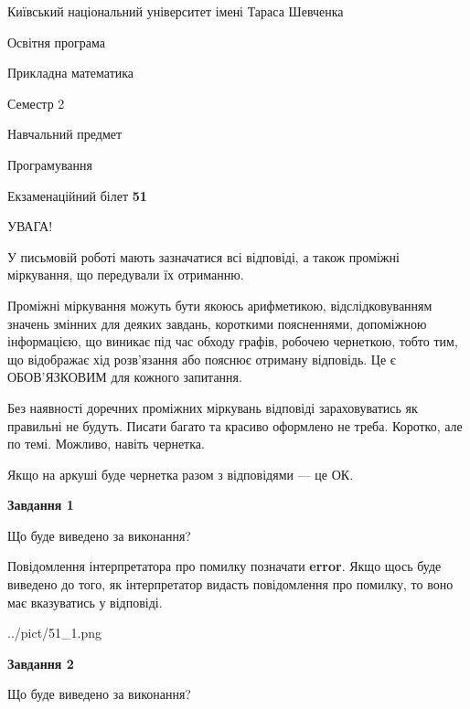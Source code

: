 \documentclass[12pt, ukrainian]{article}
\begin{document}
{{\begin {small}\par
{ \center  Київський національний університет імені Тараса Шевченка \par}
{\parbox {5 cm}{Освітня програма \hfill}{\parbox {7 cm}{Прикладна математика \hfill}}\parbox {6 cm}{\hfill Семестр 2}}\par
{\parbox {5 cm} {Навчальний предмет \hfill}\parbox {7 cm}{Програмування \hfill}\parbox {6cm}{\hfill}\par}\vspace{-7pt} \end{small}}{\center Екзаменаційний білет \No \textbf
{ 51 }\par}}
{
\begin {large}
УВАГА!

У письмовій роботі мають зазначатися всі відповіді, а також проміжні міркування, що передували їх отриманню.

Проміжні міркування можуть бути якоюсь арифметикою, відслідковуванням зна\-чень змінних для деяких завдань,
короткими поясненнями, допоміжною інформацією, що виникає під час обходу графів, робочею чернеткою,
тобто тим, що відображає хід розв’язання або пояснює отриману відповідь.
Це є ОБОВ’ЯЗКОВИМ для кожного запитання.

Без наявності доречних проміжних міркувань відповіді зараховуватись як правиль\-ні не будуть.
Писати багато та красиво оформлено не треба. Коротко, але по темі. Можли\-во, навіть чернетка.

Якщо на аркуші буде чернетка разом з відповідями --- це ОК.

\newpage

{\begin {center}\textbf{Завдання 1}\end {center}}\par
Що буде виведено за виконання?

Повідомлення інтерпретатора про помилку позначати \textbf{error}.
Якщо щось буде виведено до того, як інтерпретатор видасть повідомлення про помилку, 
то воно має вказуватись у відповіді. \par


\begin{center}
	{../pict/51_1.png}
\end{center}
\newpage

{\begin {center}\textbf{Завдання 2}\end {center}}\par
Що буде виведено за виконання?


\end{large}}
\end{document}
